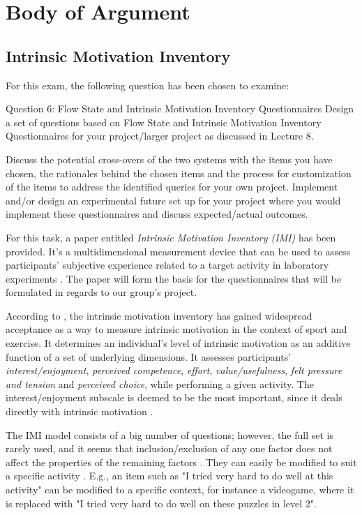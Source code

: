 \chapter{Body of Argument}
\section{Intrinsic Motivation Inventory}
For this exam, the following question has been chosen to examine:

\begin{fancyquotes}
Question 6: Flow State and Intrinsic Motivation Inventory Questionnaires
Design a set of questions based on Flow State and Intrinsic Motivation Inventory Questionnaires for your project/larger project as discussed in Lecture 8.

Discuss the potential cross-overs of the two systems with the items you have chosen, the rationales behind the chosen items and the process for customization of the items to address the identified queries for your own project. Implement and/or design an experimental future set up for your project where you would implement these questionnaires and discuss expected/actual outcomes. 

\end{fancyquotes}

For this task, a paper entitled \textit{Intrinsic Motivation Inventory (IMI)} has been provided. It's a multidimensional measurement device that can be used to assess participants' subjective experience related to a target activity in laboratory experiments \citep{imiOne}. The paper will form the basis for the questionnaires that will be formulated in regards to our group's project.

According to \cite{imiTwo}, the intrinsic motivation inventory has gained widespread acceptance as a way to measure intrinsic motivation in the context of sport and exercise. It determines an individual's level of intrinsic motivation as an additive function of a set of underlying dimensions. It assesses participants' \textit{interest/enjoyment}, \textit{perceived competence}, \textit{effort}, \textit{value/usefulness}, \textit{felt pressure and tension} and \textit{perceived choice}, while performing a given activity. The interest/enjoyment subscale is deemed to be the most important, since it deals directly with intrinsic motivation \citep{imiOne}.

The IMI model consists of a big number of questions; however, the full set is rarely used, and it seems that inclusion/exclusion of any one factor does not affect the properties of the remaining factors \citep{imiTwo}. They can easily be modified to suit a specific activity \citep{imiOne}. E.g., an item such as "I tried very hard to do well at this activity" can be modified to a specific context, for instance a videogame, where it is replaced with "I tried very hard to do well on these puzzles in level 2".

